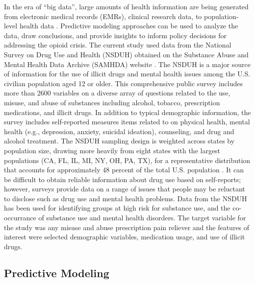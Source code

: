 \documentclass[sigconf]{acmart}
\begin{document}
In the era of ``big data'', large amounts of health information are being 
generated from electronic medical records (EMRs), clinical research data, to 
population-level health data \cite{herland14}. Predictive modeling approaches
can be used to analyze the data, draw conclusions, and provide insights to 
inform policy decisions for addressing the opioid crisis. The current study 
used data from the National Survey on Drug Use and Health (NSDUH) obtained 
on the Substance Abuse and Mental Health Data Archive (SAMHDA) website
\cite{samhsa18}. The NSDUH is a major source of information for the use of
illicit drugs and mental health issues among the U.S. civilian population
aged 12 or older. This comprehensive public survey includes more than 2600 
variables on a diverse array of questions related to the use, misuse, and 
abuse of substances including alcohol, tobacco, prescription medications, 
and illicit drugs. In addition to typical demographic information, the survey 
includes self-reported measures items related to on physical health, mental 
health (e.g., depression, anxiety, suicidal ideation), counseling, and 
drug and alcohol treatment. The NSDUH sampling design is weighted across 
states by population size, drawing more heavily from eight states with the 
largest populations (CA, FL, IL, MI, NY, OH, PA, TX), for a representative
distribution that accounts for approximately 48 percent of the total U.S.
population \cite{samhsa18}. It can be difficult to obtain reliable information 
about drug use based on self-reports; however, surveys provide data on a 
range of issues that people may be reluctant to disclose such as drug use and 
mental health problems. Data from the NSDUH has been used for identifying 
groups at high risk for substance use, and the co-occurrance of substance use 
and mental health disorders. The target variable for the study was any misuse 
and abuse prescription pain reliever and the features of interest were selected 
demographic variables, medication usage, and use of illicit drugs. 

\subsection{Predictive Modeling}
\end{document}

